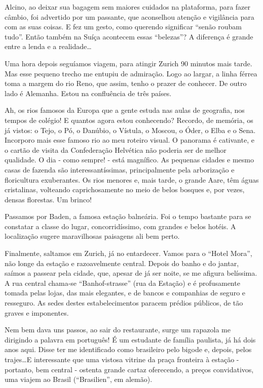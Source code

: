 Alcino, ao deixar sua bagagem sem maiores cuidados na plataforma, para fazer câmbio, foi advertido por um passante, que aconselhou atenção e vigilância para com as suas coisas. E fez um gesto, como querendo significar “senão roubam tudo”. Então também na Suíça acontecem essas “belezas”? A diferença é grande entre a lenda e a realidade\ldots

Uma hora depois seguíamos viagem, para atingir Zurich 90 minutos mais tarde. Mas esse pequeno trecho me entupiu de admiração. Logo ao largar, a linha férrea toma a margem do rio Reno, que assim, tenho o prazer de conhecer. De outro lado é Alemanha. Estou na confluência de três países.

Ah, os rios famosos da Europa que a gente estuda nas aulas de geografia, nos tempos de colégio! E quantos agora estou conhecendo? Recordo, de memória, os já vistos: o Tejo, o Pó, o Danúbio, o Vístula, o Moscou, o Óder, o Elba e o Sena. Incorporo mais esse famoso rio ao meu roteiro visual. O panorama é cativante, e o cartão de visita da Confederação Helvética não poderia ser de melhor qualidade. O dia - como sempre! - está magnífico. As pequenas cidades e mesmo casas de fazenda são interessantíssimas, principalmente pela arborização e floricultura exuberantes. Os rios menores e, mais tarde, o grande Aare, têm águas cristalinas, volteando caprichosamente no meio de belos bosques e, por vezes, densas florestas. Um brinco!

Passamos por Baden, a famosa estação balneária. Foi o tempo bastante para se constatar a classe do lugar, concorridíssimo, com grandes e belos hotéis. A localização sugere maravilhosas paisagens ali bem perto.

Finalmente, saltamos em Zurich, já no entardecer. Vamos para o “Hotel Mora”, não longe da estação e razoavelmente central. Depois do banho e do jantar, saímos a passear pela cidade, que, apesar de já ser noite, se me afigura belíssima. A rua central chama-se “Banhof-strasse” (rua da Estação) e é profusamente tomada pelas lojas, das mais elegantes, e de bancos e companhias de seguro e resseguro. As sedes destes estabelecimentos paracem prédios públicos, de tão graves e imponentes.

Nem bem dava uns passos, ao sair do restaurante, surge um rapazola me dirigindo a palavra em português! É um estudante de família paulista, já há dois anos aqui. Disse ter me identificado como brasileiro pelo bigode e, depois, pelos trajes\ldots E interessante que uma vistosa vitrine da praça fronteira à estação - portanto, bem central - ostenta grande cartaz oferecendo, a preços convidativos, uma viajem ao Brasil (“Brasilien”, em alemão).

